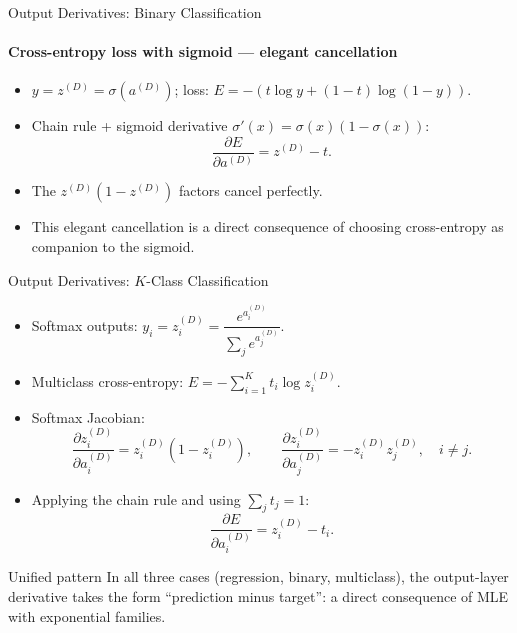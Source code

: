 \begin{frame}{Output Derivatives: Binary Classification}
  \framesubtitle{Cross-entropy loss with sigmoid — elegant cancellation}
  \begin{center}
  \end{center}
  \begin{itemize}
    \item $y = z^{(D)} = \sigma(a^{(D)})$; loss: $E = -(t\log y + (1-t)\log(1-y))$.
    \item Chain rule + sigmoid derivative $\sigma'(x) = \sigma(x)(1-\sigma(x))$:
    \[
      \frac{\partial E}{\partial a^{(D)}} = z^{(D)} - t.
    \]
    \item The $z^{(D)}(1-z^{(D)})$ factors \alert{cancel perfectly}.
    \item This elegant cancellation is a direct consequence of choosing cross-entropy as companion to the sigmoid.
  \end{itemize}
\end{frame}

\begin{frame}{Output Derivatives: $K$-Class Classification}
  \begin{itemize}
    \item Softmax outputs: $y_i = z_i^{(D)} = \dfrac{e^{a_i^{(D)}}}{\sum_j e^{a_j^{(D)}}}$.
    \item Multiclass cross-entropy: $E = -\sum_{i=1}^K t_i \log z_i^{(D)}$.
    \item Softmax Jacobian:
    \[
      \frac{\partial z_i^{(D)}}{\partial a_i^{(D)}} = z_i^{(D)}(1-z_i^{(D)}), \qquad
      \frac{\partial z_i^{(D)}}{\partial a_j^{(D)}} = -z_i^{(D)} z_j^{(D)}, \quad i\ne j.
    \]
    \item Applying the chain rule and using $\sum_j t_j = 1$:
    \[
      \frac{\partial E}{\partial a_i^{(D)}} = z_i^{(D)} - t_i.
    \]
  \end{itemize}
  \begin{alertblock}{Unified pattern}
    In all three cases (regression, binary, multiclass), the output-layer derivative takes the
    form \alert{``prediction minus target''}: a direct consequence of MLE with exponential families.
  \end{alertblock}
\end{frame}

